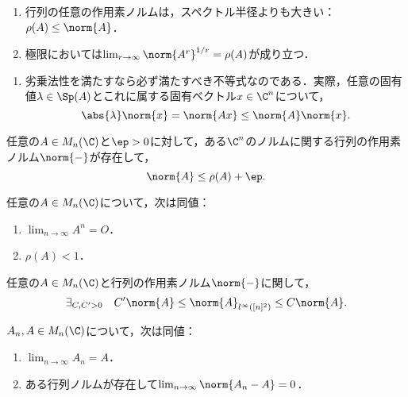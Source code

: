 \documentclass[uplatex, dvipdfmx]{jsreport}
\begin{document}
\begin{theorem}[スペクトル半径と作用素ノルム]\mbox{}
    \begin{enumerate}
        \item 行列の任意の作用素ノルムは，スペクトル半径よりも大きい：$\rho(A)\le\norm{A}$．
        \item 極限においては$\lim_{r\to\infty}\norm{A^r}^{1/r}=\rho(A)$が成り立つ．
    \end{enumerate}
\end{theorem}
\begin{Proof}\mbox{}
    \begin{enumerate}
        \item 劣乗法性を満たすなら必ず満たすべき不等式なのである．実際，任意の固有値$\lambda\in\Sp(A)$とこれに属する固有ベクトル$x\in\C^n$について，
        \[\abs{\lambda}\norm{x}=\norm{Ax}\le\norm{A}\norm{x}.\]
    \end{enumerate}
\end{Proof}

\begin{theorem}[行列ノルムの稠密性?]
    任意の$A\in M_n(\C)$と$\ep>0$に対して，ある$\C^n$のノルムに関する行列の作用素ノルム$\norm{-}$が存在して，
    \[\norm{A}\le\rho(A)+\ep.\]
\end{theorem}

\begin{corollary}
    任意の$A\in M_n(\C)$について，次は同値：
    \begin{enumerate}
        \item $\lim_{n\to\infty}A^n=O$．
        \item $\rho(A)<1$．
    \end{enumerate}
\end{corollary}

\begin{theorem}[作用素ノルムの同値性]
    任意の$A\in M_n(\C)$と行列の作用素ノルム$\norm{-}$に関して，
    \[\exists_{C,C'>0}\quad C'\norm{A}\le\norm{A}_{l^\infty([n]^2)}\le C\norm{A}.\]
\end{theorem}

\begin{corollary}
    $A_n,A\in M_n(\C)$について，次は同値：
    \begin{enumerate}
        \item $\lim_{n\to\infty}A_n=A$．
        \item ある行列ノルムが存在して$\lim_{n\to\infty}\norm{A_n-A}=0$．
    \end{enumerate}
\end{corollary}
\end{document}
